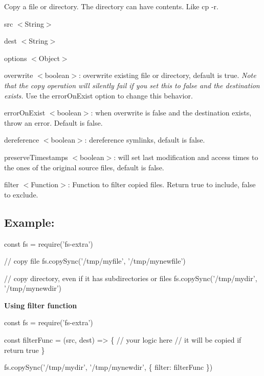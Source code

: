 Copy a file or directory. The directory can have contents. Like {\ttfamily cp -\/r}.


\begin{DoxyItemize}
\item {\ttfamily src} {\ttfamily $<$String$>$}
\item {\ttfamily dest} {\ttfamily $<$String$>$}
\item {\ttfamily options} {\ttfamily $<$Object$>$}
\begin{DoxyItemize}
\item {\ttfamily overwrite} {\ttfamily $<$boolean$>$}\+: overwrite existing file or directory, default is {\ttfamily true}. {\itshape Note that the copy operation will silently fail if you set this to {\ttfamily false} and the destination exists.} Use the {\ttfamily error\+On\+Exist} option to change this behavior.
\item {\ttfamily error\+On\+Exist} {\ttfamily $<$boolean$>$}\+: when {\ttfamily overwrite} is {\ttfamily false} and the destination exists, throw an error. Default is {\ttfamily false}.
\item {\ttfamily dereference} {\ttfamily $<$boolean$>$}\+: dereference symlinks, default is {\ttfamily false}.
\item {\ttfamily preserve\+Timestamps} {\ttfamily $<$boolean$>$}\+: will set last modification and access times to the ones of the original source files, default is {\ttfamily false}.
\item {\ttfamily filter} {\ttfamily $<$Function$>$}\+: Function to filter copied files. Return {\ttfamily true} to include, {\ttfamily false} to exclude.
\end{DoxyItemize}
\end{DoxyItemize}

\subsection*{Example\+:}


\begin{DoxyCode}
const fs = require('fs-extra')

// copy file
fs.copySync('/tmp/myfile', '/tmp/mynewfile')

// copy directory, even if it has subdirectories or files
fs.copySync('/tmp/mydir', '/tmp/mynewdir')
\end{DoxyCode}


{\bfseries Using filter function}


\begin{DoxyCode}
const fs = require('fs-extra')

const filterFunc = (src, dest) => \{
  // your logic here
  // it will be copied if return true
\}

fs.copySync('/tmp/mydir', '/tmp/mynewdir', \{ filter: filterFunc \})
\end{DoxyCode}
 